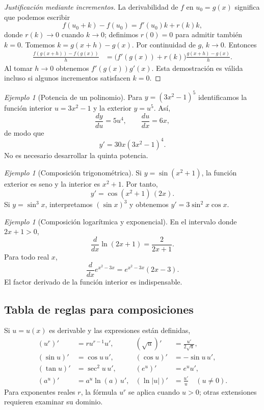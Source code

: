 \documentclass[12pt]{article}
\theoremstyle{remark}
\newtheorem{ejemplo}[definicion]{Ejemplo}
\begin{document}
\begin{proof}[Justificación mediante incrementos]
La derivabilidad de $f$ en $u_0=g(x)$ significa que podemos escribir
\[
f(u_0+k)-f(u_0)=f'(u_0)k+r(k)k,
\]
donde $r(k)\to0$ cuando $k\to0$; definimos $r(0)=0$ para admitir también $k=0$. Tomemos $k=g(x+h)-g(x)$. Por continuidad de $g$, $k\to0$. Entonces
\begin{align*}
\frac{f(g(x+h))-f(g(x))}h
&=\bigl(f'(g(x))+r(k)\bigr)\frac{g(x+h)-g(x)}h.
\end{align*}
Al tomar $h\to0$ obtenemos $f'(g(x))g'(x)$. Esta demostración es válida incluso si algunos incrementos satisfacen $k=0$.
\end{proof}

\begin{ejemplo}[Potencia de un polinomio]
Para $y=(3x^2-1)^5$ identificamos la función interior $u=3x^2-1$ y la exterior $y=u^5$. Así,
\[
\frac{dy}{du}=5u^4,\qquad\frac{du}{dx}=6x,
\]
de modo que
\[
\boxed{y'=30x(3x^2-1)^4.}
\]
No es necesario desarrollar la quinta potencia.
\end{ejemplo}

\begin{ejemplo}[Composición trigonométrica]
Si $y=\sin(x^2+1)$, la función exterior es seno y la interior es $x^2+1$. Por tanto,
\[\boxed{y'=\cos(x^2+1)\,(2x).}\]
Si $y=\sin^3x$, interpretamos $(\sin x)^3$ y obtenemos $\boxed{y'=3\sin^2x\cos x}$.
\end{ejemplo}

\begin{ejemplo}[Composición logarítmica y exponencial]
En el intervalo donde $2x+1>0$,
\[
\frac{d}{dx}\ln(2x+1)=\frac{2}{2x+1}.
\]
Para todo real $x$,
\[
\frac{d}{dx}e^{x^2-3x}=e^{x^2-3x}(2x-3).
\]
El factor derivado de la función interior es indispensable.
\end{ejemplo}

\subsection*{Tabla de reglas para composiciones}
Si $u=u(x)$ es derivable y las expresiones están definidas,
\begin{align*}
(u^r)'&=ru^{r-1}u',&(\sqrt{u})'&=\frac{u'}{2\sqrt u},\\
(\sin u)'&=\cos u\,u',&(\cos u)'&=-\sin u\,u',\\
(\tan u)'&=\sec^2u\,u',&(e^u)'&=e^u u',\\
(a^u)'&=a^u\ln(a)\,u',&(\ln|u|)'&=\frac{u'}u\quad(u\ne0).
\end{align*}
Para exponentes reales $r$, la fórmula $u^r$ se aplica cuando $u>0$; otras extensiones requieren examinar su dominio.
\end{document}
